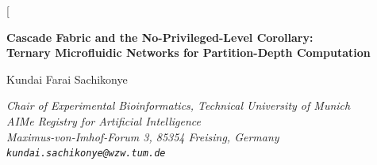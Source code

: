 \documentclass[11pt,twocolumn,a4paper]{article}
\theoremstyle{remark}
\begin{document}
\twocolumn[
\begin{@twocolumnfalse}
\begin{center}

{\LARGE\bfseries Cascade Fabric and the No-Privileged-Level Corollary:\\[4pt]
Ternary Microfluidic Networks for Partition-Depth Computation}

\vspace{12pt}

{\large Kundai Farai Sachikonye}

\vspace{6pt}

{\small\itshape Chair of Experimental Bioinformatics, Technical University of Munich \\[0.3em]
\small\itshape AIMe Registry for Artificial Intelligence \\[0.2em]
\small\itshape Maximus-von-Imhof-Forum 3, 85354 Freising, Germany \\[0.2em]
\texttt{kundai.sachikonye@wzw.tum.de}}

\vspace{6pt}{\small May 2026}

\vspace{16pt}


\end{center}
\end{@twocolumnfalse}
\end{document}
